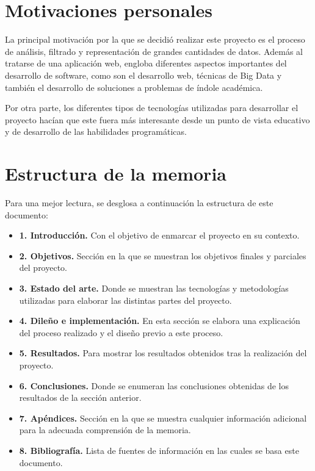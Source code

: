 \documentclass[a4paper, spanish, 12pt]{book}
\begin{document}
\section{Motivaciones personales}
\label{sec:motivaciones}

La principal motivaci\'on por la que se decidi\'o realizar este proyecto es el
proceso de an\'alisis, filtrado y representaci\'on de grandes cantidades de datos.
Adem\'as al tratarse de una aplicaci\'on web, engloba diferentes
aspectos importantes del desarrollo de software, como son el desarrollo web,
t\'ecnicas de Big Data y tambi\'en el desarrollo de soluciones a problemas de
\'indole acad\'emica.

Por otra parte, los diferentes tipos de tecnolog\'ias utilizadas para desarrollar
el proyecto hac\'ian que este fuera m\'as interesante desde un punto de vista
educativo y de desarrollo de las habilidades program\'aticas.

\section{Estructura de la memoria}
\label{sec:estructura}

Para una mejor lectura, se desglosa a continuaci\'on la estructura de este documento:

\begin{itemize}
  \item \textbf{1. Introducci\'on.} Con el objetivo de enmarcar el proyecto en
  su contexto.

  \item \textbf{2. Objetivos.} Secci\'on en la que se muestran los objetivos
  finales y parciales del proyecto.

  \item \textbf{3. Estado del arte.} Donde se muestran las tecnolog\'ias y metodolog\'ias
  utilizadas para elaborar las distintas partes del proyecto.

  \item \textbf{4. Dile\~no e implementaci\'on.} En esta secci\'on se elabora una
  explicaci\'on del proceso realizado y el dise\~no previo a este proceso.

  \item \textbf{5. Resultados.} Para mostrar los resultados obtenidos tras la realizaci\'on
  del proyecto.

  \item \textbf{6. Conclusiones.} Donde se enumeran las conclusiones obtenidas de
  los resultados de la secci\'on anterior.

  \item \textbf{7. Ap\'endices.} Secci\'on en la que se muestra cualquier informaci\'on
  adicional para la adecuada comprensi\'on de la memoria.

  \item \textbf{8. Bibliograf\'ia.} Lista de fuentes de informaci\'on en las cuales
  se basa este documento.
\end{itemize}
\end{document}
